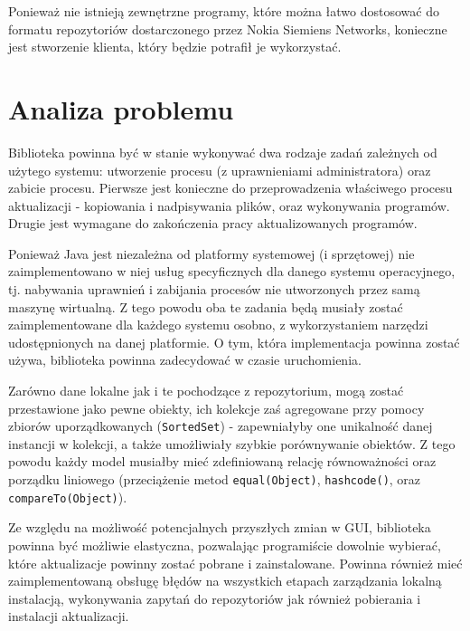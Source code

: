 \documentclass[polish,12pt,titlepage]{article}
\begin{document}
Ponieważ nie istnieją zewnętrzne programy, które można łatwo dostosować do
formatu repozytoriów dostarczonego przez Nokia Siemiens Networks, konieczne
jest stworzenie klienta, który będzie potrafił je wykorzystać.

\newpage


\section{Analiza problemu}

Biblioteka powinna być w stanie wykonywać dwa rodzaje zadań zależnych od
użytego systemu: utworzenie procesu (z uprawnieniami administratora) oraz
zabicie procesu. Pierwsze jest konieczne do przeprowadzenia właściwego procesu
aktualizacji - kopiowania i nadpisywania plików, oraz wykonywania programów.
Drugie jest wymagane do zakończenia pracy aktualizowanych programów.

Ponieważ Java jest niezależna od platformy systemowej (i sprzętowej) nie
zaimplementowano w niej usług specyficznych dla danego systemu
operacyjnego, tj. nabywania uprawnień \cite{JAVA_VISTA_UPRAWNIENIA} i
zabijania procesów nie utworzonych przez samą maszynę wirtualną. Z tego
powodu oba te zadania będą musiały zostać zaimplementowane dla każdego
systemu osobno, z wykorzystaniem narzędzi udostępnionych na danej platformie.
O tym, która implementacja powinna zostać używa, biblioteka powinna
zadecydować w czasie uruchomienia.

Zarówno dane lokalne jak i te pochodzące z repozytorium, mogą zostać
przestawione jako pewne obiekty, ich kolekcje zaś agregowane przy pomocy
zbiorów uporządkowanych (\texttt{SortedSet}) - zapewniałyby one unikalność
danej instancji w kolekcji, a także umożliwiały szybkie porównywanie obiektów.
Z tego powodu każdy model musiałby mieć zdefiniowaną relację równoważności
oraz porządku liniowego (przeciążenie metod \texttt{equal(Object)},
\texttt{hashcode()}, oraz \texttt{compareTo(Object)}).

Ze względu na możliwość potencjalnych przyszłych zmian w GUI, biblioteka 
powinna być możliwie elastyczna, pozwalając programiście dowolnie wybierać, 
które aktualizacje powinny zostać pobrane i zainstalowane. Powinna również
mieć zaimplementowaną obsługę błędów na wszystkich etapach zarządzania
lokalną instalacją, wykonywania zapytań do repozytoriów jak również
pobierania i instalacji aktualizacji.
\end{document}
